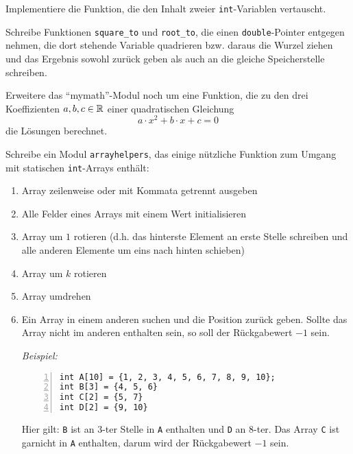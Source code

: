\documentclass{uebungszettel}
\begin{document}
\begin{aufg}
Implementiere die Funktion, die den Inhalt zweier \verb|int|-Variablen vertauscht.
\end{aufg}

\begin{aufg}
Schreibe Funktionen \verb|square_to| und \verb|root_to|, die einen \verb|double|-Pointer entgegen nehmen, die dort 
stehende Variable quadrieren bzw. daraus die Wurzel ziehen und das Ergebnis sowohl zurück geben als auch an die gleiche 
Speicherstelle schreiben.
\end{aufg}

\begin{aufg}
Erweitere das "`mymath"'-Modul noch um eine Funktion, die zu den drei Koeffizienten $a, b, c \in \mathbb{R}$ einer quadratischen
 Gleichung $$
a \cdot x^2 + b \cdot x + c = 0 $$
die Lösungen berechnet.
\end{aufg}

\begin{aufg}
Schreibe ein Modul \verb|arrayhelpers|, das einige nützliche Funktion zum Umgang mit statischen \verb|int|-Arrays enthält:
\begin{enumerate}
\item Array zeilenweise oder mit Kommata getrennt ausgeben
\item Alle Felder eines Arrays mit einem Wert initialisieren
\item Array um $1$ rotieren (d.h. das hinterste Element an erste Stelle schreiben und alle anderen Elemente um eins nach hinten schieben)
\item Array um $k$ rotieren 
\item Array umdrehen
\item Ein Array in einem anderen suchen und die Position zurück geben. Sollte das Array nicht im anderen enthalten sein, so soll der Rückgabewert $-1$ sein.

\emph{Beispiel:} 
\begin{codelisting}
\begin{lstlisting}[numbers=left,numberstyle=\tiny,frame=tlrb]
int A[10] = {1, 2, 3, 4, 5, 6, 7, 8, 9, 10};
int B[3] = {4, 5, 6}
int C[2] = {5, 7}
int D[2] = {9, 10}
\end{lstlisting}
\end{codelisting}
Hier gilt: \verb|B| ist an $3$-ter Stelle in \verb|A| enthalten und \verb|D| an $8$-ter. Das Array \verb|C| ist garnicht in \verb|A| enthalten, darum wird der Rückgabewert $-1$ sein.
\end{enumerate}
\end{aufg}
\end{document}
